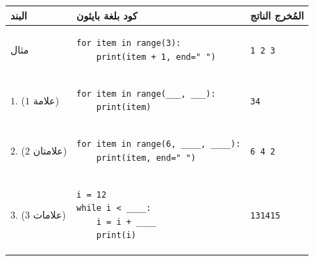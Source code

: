 \documentclass[14pt]{extarticle}
\begin{document}
\begin{enumerate}[label=\textbf{السؤال \arabic*:}, wide=0pt, itemsep=2.2em]
{\renewcommand{\arraystretch}{1.4}
\begin{longtable}{|C{1.8cm}|p{8.7cm}|C{4cm}|}
\hline
\textbf{البند} & \centering\textbf{كود بلغة بايثون} & \textbf{المُخرج الناتج} \\
\hline
مثال &
\begin{pycell}
\begin{english}
\begin{verbatim}
for item in range(3):
    print(item + 1, end=" ")
\end{verbatim}
\end{english}
\end{pycell}
& \begin{english}\texttt{1 2 3}\end{english} \\
\hline
$1$. \newline ($1$ علامة) &
\begin{pycell}
\begin{english}
\begin{verbatim}
for item in range(___, ___):
    print(item)
\end{verbatim}
\end{english}
\end{pycell}
& \begin{english}\texttt{3}\newline\texttt{4}\end{english} \\
\hline
$2$. \newline ($2$ علامتان) &
\begin{pycell}
\begin{english}
\begin{verbatim}
for item in range(6, ____, ____):
    print(item, end=" ")
\end{verbatim}
\end{english}
\end{pycell}
& \begin{english}\texttt{6 4 2}\end{english} \\
\hline
$3$. \newline ($3$ علامات) &
\begin{pycell}
\begin{english}
\begin{verbatim}
i = 12
while i < ____:
    i = i + ____
    print(i)
\end{verbatim}
\end{english}
\end{pycell}
& \begin{english}\texttt{13}\newline\texttt{14}\newline\texttt{15}\end{english} \\

\end{longtable}}
\end{enumerate}
\end{document}
